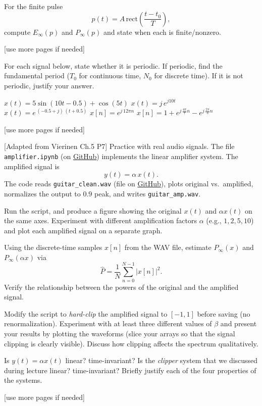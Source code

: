 \documentclass{ee102_pset}
\begin{document}
\problempart{[10 points]}  For the finite pulse
  \[
  p(t)=A\,\mathrm{rect}\!\left(\frac{t-t_0}{T}\right),
  \]
  compute $E_\infty(p)$ and $P_\infty(p)$ and state when each is finite/nonzero.

\vspace*{\fill}
\begin{center}
[use more pages if needed]
\end{center}

For each signal below, state whether it is periodic. If periodic, find the fundamental period ($T_0$ for continuous time, $N_0$ for discrete time). If it is not periodic, justify your answer.

\problempart{[10 points]} $x(t)=5\sin(10t-0.5)+\cos(5t)$
\problempart{[10 points]} $x(t)=j\,e^{j10t}$
\problempart{[10 points]} $x(t)=e^{\,(-0.5+j)\,(t+0.5)}$
\problempart{[10 points]} $x[n]=e^{j\,12\pi n}$
\problempart{[10 points]} $x[n]=1+e^{j\,\frac{4\pi}{7}n}-e^{j\,\frac{2\pi}{3}n}$

\vspace*{\fill}
\begin{center}
[use more pages if needed]
\end{center}

 [Adapted from Vierinen Ch.5 P7] Practice with real audio signals. The file \texttt{amplifier.ipynb} (on \href{https://github.com/ee-ucmerced/ee102-signals-systems/tree/main/lecture_notes/week3_special_signals/amplifier.ipynb}{GitHub}) implements the linear amplifier system. The amplified signal is
\[
y(t)=\alpha\,x(t).
\]
The code reads \texttt{guitar\_clean.wav} (file on \href{https://github.com/ee-ucmerced/ee102-signals-systems/tree/main/lecture_notes/week3_special_signals/guitar_clean.wav}{GitHub}), plots original vs.\ amplified, normalizes the output to $0.9$ peak, and writes \texttt{guitar\_amp.wav}.

\problempart{[2.5 points]} Run the script, and produce a figure showing the original $x(t)$ and $\alpha x(t)$ on the same axes. Experiment with different amplification factors $\alpha$ (e.g., $1,2,5,10$) and plot each amplified signal on a separate graph.

\problempart{[10 points]} Using the discrete-time samples $x[n]$ from the WAV file, estimate $P_\infty(x)$ and $P_\infty(\alpha x)$ via
  \[
  \widehat{P}=\frac{1}{N}\sum_{n=0}^{N-1}|x[n]|^2.
  \]
  Verify the relationship between the powers of the original and the amplified signal.

\problempart{[5 points]} Modify the script to \emph{hard-clip} the amplified signal to $[-1,1]$ before saving (no renormalization). Experiment with at least three different values of $\beta$ and present your results by plotting the waveforms (slice your arrays so that the signal clipping is clearly visible). Discuss how clipping affects the spectrum qualitatively.

\problempart{[2.5 points]} Is $y(t)=\alpha x(t)$ linear? time-invariant? Is the \emph{clipper} system that we discussed during lecture linear? time-invariant? Briefly justify each of the four properties of the systems.
\vspace*{\fill}
\begin{center}
[use more pages if needed]
\end{center}
\end{document}
